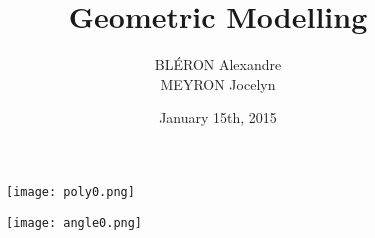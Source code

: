 \documentclass[a4paper,11pt]{article}
\title{Geometric Modelling}
\author{BLÉRON Alexandre\\MEYRON Jocelyn}
\date{January 15th, 2015}
\begin{document}
\maketitle

\begin{figure}[H]
\centering
\begin{minipage}{0.35\paperwidth}
\texttt{[image: poly0.png]}
\end{minipage}
\begin{minipage}{0.35\paperwidth}
\texttt{[image: angle0.png]}
\end{minipage}
\end{figure}
\end{document}

